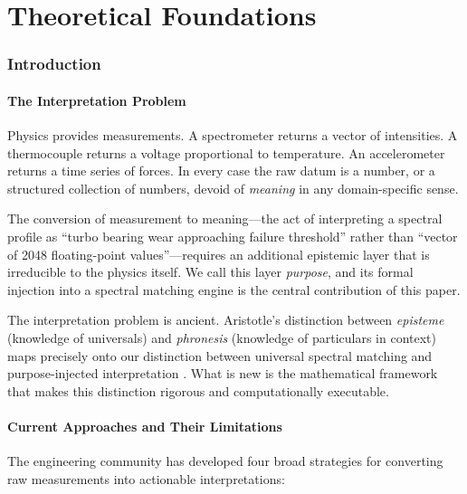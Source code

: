 \documentclass[11pt,twocolumn,a4paper]{article}
\theoremstyle{definition}
\theoremstyle{remark}
\begin{document}

\part{Theoretical Foundations}

\section{Introduction}\label{sec:introduction}

\subsection{The Interpretation Problem}

Physics provides measurements.  A spectrometer returns a vector of intensities.  A thermocouple returns a voltage proportional to temperature.  An accelerometer returns a time series of forces.  In every case the raw datum is a number, or a structured collection of numbers, devoid of \emph{meaning} in any domain-specific sense.

The conversion of measurement to meaning---the act of interpreting a spectral profile as ``turbo bearing wear approaching failure threshold'' rather than ``vector of 2048 floating-point values''---requires an additional epistemic layer that is irreducible to the physics itself.  We call this layer \emph{purpose}, and its formal injection into a spectral matching engine is the central contribution of this paper.

The interpretation problem is ancient.  Aristotle's distinction between \emph{episteme} (knowledge of universals) and \emph{phronesis} (knowledge of particulars in context) maps precisely onto our distinction between universal spectral matching and purpose-injected interpretation \citep{boltzmann1896vorlesungen}.  What is new is the mathematical framework that makes this distinction rigorous and computationally executable.

\subsection{Current Approaches and Their Limitations}

The engineering community has developed four broad strategies for converting raw measurements into actionable interpretations:
\end{document}
